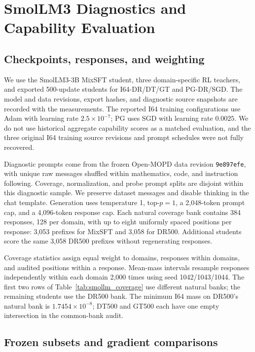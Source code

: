 \section{SmolLM3 Diagnostics and Capability Evaluation}
\label{app:smollm_diagnostics}

\subsection{Checkpoints, responses, and weighting}

We use the SmolLM3-3B MixSFT student, three domain-specific RL teachers, and exported 500-update students for I64-DR/DT/GT and PG-DR/SGD. The model and data revisions, export hashes, and diagnostic source snapshots are recorded with the measurements. The reported I64 training configurations use Adam with learning rate $2.5\times10^{-7}$; PG uses SGD with learning rate $0.0025$. We do not use historical aggregate capability scores as a matched evaluation, and the three original I64 training source revisions and prompt schedules were not fully recovered.

Diagnostic prompts come from the frozen Open-MOPD data revision \texttt{9e897efe}, with unique raw messages shuffled within mathematics, code, and instruction following. Coverage, normalization, and probe prompt splits are disjoint within this diagnostic sample. We preserve dataset messages and disable thinking in the chat template. Generation uses temperature 1, top-$p=1$, a 2,048-token prompt cap, and a 4,096-token response cap. Each natural coverage bank contains 384 responses, 128 per domain, with up to eight uniformly spaced positions per response: 3,053 prefixes for MixSFT and 3,058 for DR500. Additional students score the same 3,058 DR500 prefixes without regenerating responses.

Coverage statistics assign equal weight to domains, responses within domains, and audited positions within a response. Mean-mass intervals resample responses independently within each domain 2,000 times using seed 1042/1043/1044. The first two rows of Table~\ref{tab:smollm_coverage} use different natural banks; the remaining students use the DR500 bank. The minimum I64 mass on DR500's natural bank is $1.7454\times10^{-8}$; DT500 and GT500 each have one empty intersection in the common-bank audit.



\subsection{Frozen subsets and gradient comparisons}

